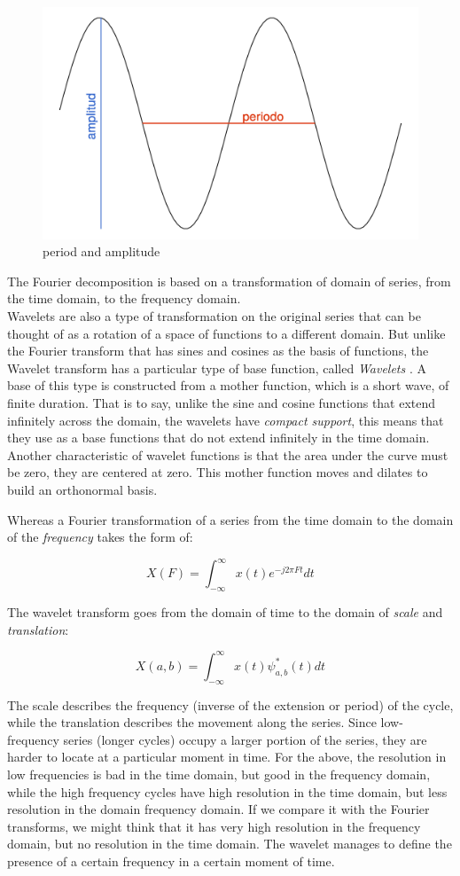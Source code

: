 \documentclass[a4paper]{article}
\begin{document}
\begin{figure}[H]
	\centering
	\includegraphics[width=0.65\linewidth]{ciclo.png}
	\caption{period and amplitude} \label{fig:ciclo}
\end{figure}

The Fourier decomposition is based on a transformation of domain of series, from the time domain, to the frequency domain.
\\

Wavelets are also a type of transformation on the original series that can be thought of as a rotation of a space of functions to a different domain. But unlike the Fourier transform that has sines and cosines as the basis of functions, the Wavelet transform has a particular type of base function, called \textit{Wavelets} \cite{castro1995wavelets}. A base of this type is constructed from a mother function, which is a short wave, of finite duration. That is to say, unlike the sine and cosine functions that extend infinitely across the domain, the wavelets have \textit{compact support}, this means that they use as a base functions that do not extend infinitely in the time domain. Another characteristic of wavelet functions is that the area under the curve must be zero, they are centered at zero. This mother function moves and dilates to build an orthonormal basis.

Whereas a Fourier transformation of a series from the time domain to the domain of the \textit{frequency} takes the form of:

$$
X(F)=\int_{-\infty}^{\infty} x(t) e^{-j2\pi Ft}dt
$$

The wavelet transform goes from the domain of time to the domain of \textit{scale} and \textit{translation}:

$$
X(a,b)=\int_{-\infty}^{\infty} x(t) \psi^*_{a,b}(t)dt
$$

The scale describes the frequency (inverse of the extension or period) of the cycle, while the translation describes the movement along the series. Since low-frequency series (longer cycles) occupy a larger portion of the series, they are harder to locate at a particular moment in time. For the above, the resolution in low frequencies is bad in the time domain, but good in the frequency domain, while the high frequency cycles have high resolution in the time domain, but less resolution in the domain frequency domain. If we compare it with the Fourier transforms, we might think that it has very high resolution in the frequency domain, but no resolution in the time domain. The wavelet manages to define the presence of a certain frequency in a certain moment of time.
\end{document}
